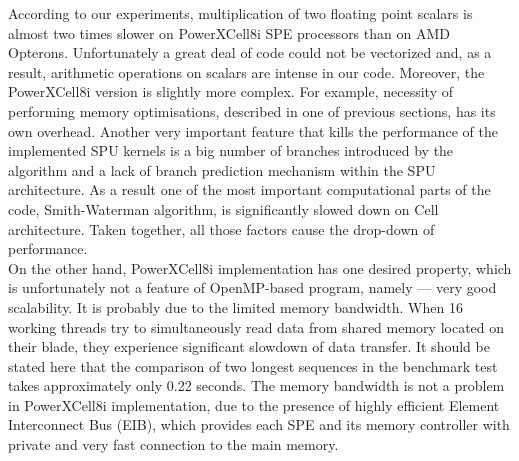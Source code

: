 According to our experiments, multiplication of two floating point scalars is
almost two times slower on PowerXCell8i SPE processors than on AMD Opterons.
Unfortunately a great deal of \prog{} code could not be vectorized and, as a
result, arithmetic operations on scalars are intense in our code.
Moreover, the PowerXCell8i version is slightly more complex.
For example, necessity of performing memory optimisations, described in one of
previous sections, has its own overhead.
Another very important feature that kills the performance of the implemented SPU
kernels is a big number of branches introduced by the algorithm and a lack of
branch prediction mechanism within the SPU architecture.
As a result one of the most important computational parts of the code,
Smith-Waterman algorithm, is significantly slowed down on Cell architecture.
Taken together, all those factors cause the drop-down of performance.\\
On the other hand, PowerXCell8i implementation has one desired property, which
is unfortunately not a feature of OpenMP-based program, namely --- very good
scalability.
It is probably due to the limited memory bandwidth.
When 16 working threads try to simultaneously read data from shared memory
located on their blade, they experience significant slowdown of data
transfer.
It should be stated here that the comparison of two longest sequences in the
benchmark test takes approximately only 0.22 seconds.
The memory bandwidth  is not a problem in PowerXCell8i implementation, due to
the presence of highly efficient Element Interconnect Bus (EIB), which provides
each SPE and its memory controller with private and very fast connection to the
main memory.


